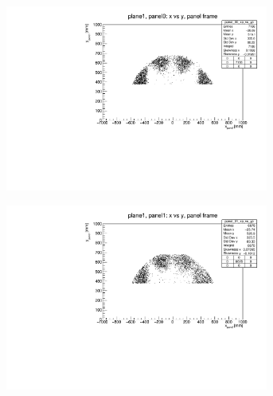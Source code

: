 \begin{figure}[!h]
    \centering
    \begin{subfigure}[b]{0.4\textwidth}
        \centering
        \includegraphics[width=0.95\textwidth]{figures/pdf/plane1_panel0_x_vs_y_all.pdf}
        \label{fig:panel0plane1}
    \end{subfigure}
    \hfill
    \begin{subfigure}[b]{0.4\textwidth}
        \centering
        \includegraphics[width=0.95\textwidth]{figures/pdf/plane1_panel1_x_vs_y_all.pdf}
        \label{fig:panel1plane1}
    \end{subfigure}
    \hfill
    \begin{subfigure}[b]{0.4\textwidth}
        \centering

\end{subfigure}
\end{figure}
